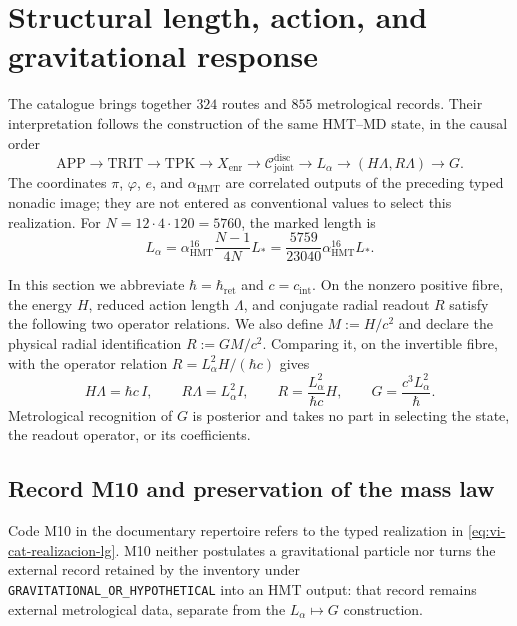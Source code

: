 \section{Structural length, action, and gravitational response}
\label{sec:vi-catalogo-dependencia-l-g}

The catalogue brings together \(324\) routes and \(855\) metrological
records. Their interpretation follows the construction of the same HMT--MD
state, in the causal order
\[
 \mathrm{APP}\longrightarrow\mathrm{TRIT}\longrightarrow\mathrm{TPK}
 \longrightarrow X_{\mathrm{enr}}
 \longrightarrow\mathcal C^{\mathrm{disc}}_{\mathrm{joint}}
 \longrightarrow L_{\alpha}
 \longrightarrow(H\Lambda,R\Lambda)
 \longrightarrow G .
 \tag{A.1}\label{eq:vi-cat-cadena-lg}
\]
The coordinates \(\pi\), \(\varphi\), \(e\), and
\(\alpha_{\mathrm{HMT}}\) are correlated outputs of the preceding typed
nonadic image; they are not entered as conventional values to select this
realization. For \(N=12\cdot4\cdot120=5760\), the marked length is
\[
 L_{\alpha}=\alpha_{\mathrm{HMT}}^{16}
 \frac{N-1}{4N}L_*
 =\frac{5759}{23040}\alpha_{\mathrm{HMT}}^{16}L_* .
 \tag{A.2}\label{eq:vi-cat-longitud-alpha}
\]

In this section we abbreviate \(\hbar=\hbar_{\mathrm{ret}}\) and
\(c=c_{\mathrm{int}}\). On the nonzero positive fibre, the energy \(H\),
reduced action length \(\Lambda\), and conjugate radial readout \(R\) satisfy
the following two operator relations. We also define \(M:=H/c^2\) and declare
the physical radial identification \(R:=GM/c^2\). Comparing it, on the
invertible fibre, with the operator relation
\(R=L_{\alpha}^{2}H/(\hbar c)\) gives
\[
 H\Lambda=\hbar c\,I,\qquad
 R\Lambda=L_{\alpha}^{2}I,\qquad
 R=\frac{L_{\alpha}^{2}}{\hbar c}H,\qquad
 \boxed{G=\frac{c^{3}L_{\alpha}^{2}}{\hbar}} .
 \tag{A.3}\label{eq:vi-cat-realizacion-lg}
\]
Metrological recognition of \(G\) is posterior and takes no part in selecting
the state, the readout operator, or its coefficients.

\subsection{Record M10 and preservation of the mass law}
\label{sec:vi-catalogo-m10-activo}

Code M10 in the documentary repertoire refers to the typed
realization in \eqref{eq:vi-cat-realizacion-lg}. M10 neither postulates a
gravitational particle nor turns the external record retained by the inventory
under \texttt{GRAVITATIONAL\_OR\_HYPOTHETICAL} into an HMT output: that record
remains external metrological data, separate from the
\(L_{\alpha}\mapsto G\) construction.

